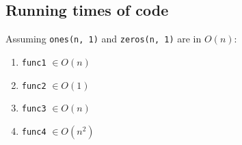 \documentclass{article}
\begin{document}
\subsection{Running times of code}

Assuming \texttt{ones(n, 1)} and \texttt{zeros(n, 1)} are in $O(n)$:
\begin{enumerate}
	\item \texttt{func1} $\in O(n)$
	\item \texttt{func2} $\in O(1)$
	\item \texttt{func3} $\in O(n)$
	\item \texttt{func4} $\in O(n^2)$
\end{enumerate}
\end{document}
